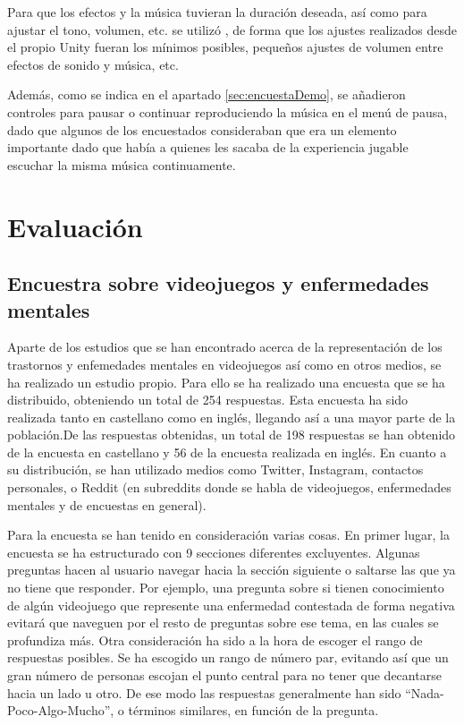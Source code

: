 \documentclass[12pt, a4paper,twoside,titlepage]{book}
\begin{document}
Para que los efectos y la música tuvieran la duración deseada, así como para ajustar el tono, volumen, etc. se utilizó , de forma que los ajustes realizados desde el propio Unity fueran los mínimos posibles, pequeños ajustes de volumen entre efectos de sonido y música, etc. 

Además, como se indica en el apartado \ref{sec:encuestaDemo}, se añadieron controles para pausar o continuar reproduciendo la música en el menú de pausa, dado que algunos de los encuestados consideraban que era un elemento importante dado que había a quienes les sacaba de la experiencia jugable escuchar la misma música continuamente. 



\chapter {Evaluación}

\section{Encuestra sobre videojuegos y enfermedades mentales}
\label{sec:encuestaVid}
Aparte de los estudios que se han encontrado acerca de la representación de los trastornos y enfemedades mentales en videojuegos así como en otros medios, se ha realizado un estudio propio. Para ello se ha realizado una encuesta que se ha distribuido, obteniendo un total de 254 respuestas. Esta encuesta ha sido realizada tanto en castellano como en inglés, llegando así a una mayor parte de la población.De las respuestas obtenidas, un total de 198 respuestas se han obtenido de la encuesta en castellano y 56 de la encuesta realizada en inglés. En cuanto a su distribución, se han utilizado medios como Twitter, Instagram, contactos personales, o Reddit (en subreddits donde se habla de videojuegos, enfermedades mentales y de encuestas en general). 

Para la encuesta se han tenido en consideración varias cosas. En primer lugar, la encuesta se ha estructurado con 9 secciones diferentes excluyentes. Algunas preguntas hacen al usuario navegar hacia la sección siguiente o saltarse las que ya no tiene que responder. Por ejemplo, una pregunta sobre si tienen conocimiento de algún videojuego que represente una enfermedad contestada de forma negativa evitará que naveguen por el resto de preguntas sobre ese tema, en las cuales se profundiza más. Otra consideración ha sido a la hora de escoger el rango de respuestas posibles. Se ha escogido un rango de número par, evitando así que un gran número de personas escojan el punto central para no tener que decantarse hacia un lado u otro. De ese modo las respuestas generalmente han sido ``Nada-Poco-Algo-Mucho'', o términos similares, en función de la pregunta. 
\end{document}
